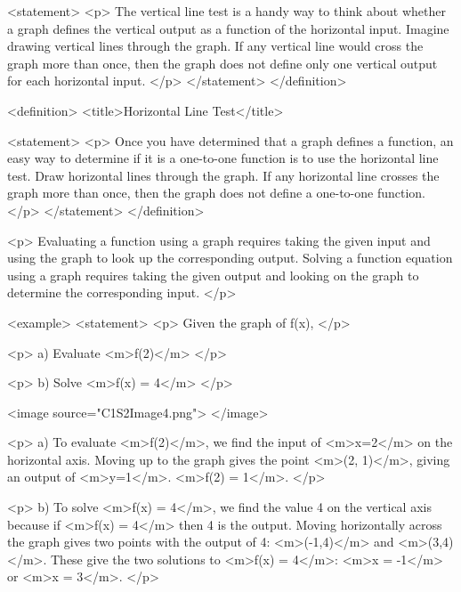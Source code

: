             <statement>
                <p>
                    The vertical line test is a handy way to think about whether a graph defines the vertical output as a function of the horizontal input.
                    Imagine drawing vertical lines through the graph.
                    If any vertical line would cross the graph more than once, then the graph does not define only one vertical output for each horizontal input.
                </p>
            </statement>
        </definition>

        <definition>
            <title>Horizontal Line Test</title>

            <statement>
                <p>
                    Once you have determined that a graph defines a function, an easy way to determine if it is a one-to-one function is to use the horizontal line test.
                    Draw horizontal lines through the graph.
                    If any horizontal line crosses the graph more than once, then the graph does not define a one-to-one function.
                </p>
            </statement>
        </definition>

        <p>
            Evaluating a function using a graph requires taking the given input and using the graph to look up the corresponding output.
            Solving a function equation using a graph requires taking the given output and looking on the graph to determine the corresponding input.
        </p>

        <example>
            <statement>
                <p>
                    Given the graph of f(x),
                </p>

                <p>
                    a) Evaluate <m>f(2)</m>
                </p>

                <p>
                    b) Solve <m>f(x) = 4</m>
                </p>

                <image source="C1S2Image4.png">
                </image>

                <p>
                    a) To evaluate <m>f(2)</m>, we find the input of <m>x=2</m> on the horizontal axis.
                    Moving up to the graph gives the point <m>(2, 1)</m>, giving an output of <m>y=1</m>.
                    <m>f(2) = 1</m>.
                </p>

                <p>
                    b) To solve <m>f(x) = 4</m>, we find the value 4 on the vertical axis because if <m>f(x) = 4</m> then 4 is the output.
                    Moving horizontally across the graph gives two points with the output of 4: <m>(-1,4)</m> and <m>(3,4)</m>.
                    These give the two solutions to <m>f(x) = 4</m>: <m>x = -1</m> or <m>x = 3</m>.
                </p>

